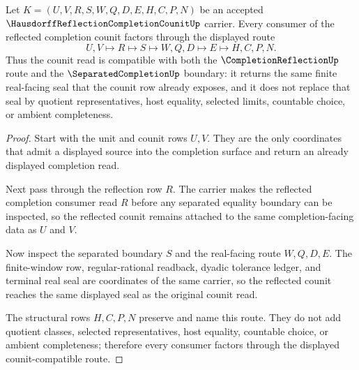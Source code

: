 \begin{theorem}
\label{thm:hausdorff-reflection-completion-counit-compatibility}
Let $K=(U,V,R,S,W,Q,D,E,H,C,P,N)$ be an accepted $\HausdorffReflectionCompletionCounitUp$ carrier. Every consumer of the reflected completion counit factors through the displayed route
$$
U,V \longmapsto R \longmapsto S \longmapsto W,Q,D \longmapsto E \longmapsto H,C,P,N .
$$
Thus the counit read is compatible with both the $\CompletionReflectionUp$ route and the $\SeparatedCompletionUp$ boundary: it returns the same finite real-facing seal that the counit row already exposes, and it does not replace that seal by quotient representatives, host equality, selected limits, countable choice, or ambient completeness.
\end{theorem}
\begin{proof}
Start with the unit and counit rows $U,V$. They are the only coordinates that admit a displayed source into the completion surface and return an already displayed completion read.

Next pass through the reflection row $R$. The carrier makes the reflected completion consumer read $R$ before any separated equality boundary can be inspected, so the reflected counit remains attached to the same completion-facing data as $U$ and $V$.

Now inspect the separated boundary $S$ and the real-facing route $W,Q,D,E$. The finite-window row, regular-rational readback, dyadic tolerance ledger, and terminal real seal are coordinates of the same carrier, so the reflected counit reaches the same displayed seal as the original counit read.

The structural rows $H,C,P,N$ preserve and name this route. They do not add quotient classes, selected representatives, host equality, countable choice, or ambient completeness; therefore every consumer factors through the displayed counit-compatible route.
\end{proof}

